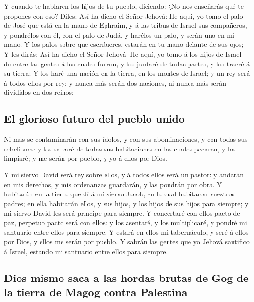  Y cuando te hablaren los hijos de tu pueblo, diciendo: ¿No
nos enseñarás qué te propones con eso?  Diles: Así ha dicho
el Señor Jehová: He aquí, yo tomo el palo de José que está en la mano de
Ephraim, y á las tribus de Israel sus compañeros, y pondrélos con él,
con el palo de Judá, y harélos un palo, y serán uno en mi mano.
 Y los palos sobre que escribieres, estarán en tu mano
delante de sus ojos;  Y les dirás: Así ha dicho el Señor
Jehová: He aquí, yo tomo á los hijos de Israel de entre las gentes á las
cuales fueron, y los juntaré de todas partes, y los traeré á su tierra:
 Y los haré una nación en la tierra, en los montes de
Israel; y un rey será á todos ellos por rey: y nunca más serán dos
naciones, ni nunca más serán divididos en dos reinos:

\hypertarget{el-glorioso-futuro-del-pueblo-unido}{%
\subsection{El glorioso futuro del pueblo
unido}\label{el-glorioso-futuro-del-pueblo-unido}}

 Ni más se contaminarán con sus ídolos, y con sus
abominaciones, y con todas sus rebeliones: y los salvaré de todas sus
habitaciones en las cuales pecaron, y los limpiaré; y me serán por
pueblo, y yo á ellos por Dios.

 Y mi siervo David será rey sobre ellos, y á todos ellos
será un pastor: y andarán en mis derechos, y mis ordenanzas guardarán, y
las pondrán por obra.  Y habitarán en la tierra que dí á mi
siervo Jacob, en la cual habitaron vuestros padres; en ella habitarán
ellos, y sus hijos, y los hijos de sus hijos para siempre; y mi siervo
David les será príncipe para siempre.  Y concertaré con
ellos pacto de paz, perpetuo pacto será con ellos: y los asentaré, y los
multiplicaré, y pondré mi santuario entre ellos para siempre.
 Y estará en ellos mi tabernáculo, y seré á ellos por Dios,
y ellos me serán por pueblo.  Y sabrán las gentes que yo
Jehová santifico á Israel, estando mi santuario entre ellos para
siempre.

\hypertarget{dios-mismo-saca-a-las-hordas-brutas-de-gog-de-la-tierra-de-magog-contra-palestina}{%
\subsection{Dios mismo saca a las hordas brutas de Gog de la tierra de
Magog contra
Palestina}\label{dios-mismo-saca-a-las-hordas-brutas-de-gog-de-la-tierra-de-magog-contra-palestina}}

